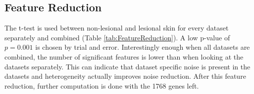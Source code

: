 \documentclass[10pt,a4paper]{article}
\begin{document}
	
	\subsection{Feature Reduction}
	\label{subsec:ResultsFeatureResuction}
	
	The t-test is used between non-lesional and lesional skin for every dataset separately and combined (Table \ref{tab:FeatureReduction}). A low p-value of $p=0.001$ is chosen by trial and error. Interestingly enough when all datasets are combined, the number of significant features is lower than when looking at the datasets separately. This can indicate that dataset specific noise is present in the datasets and heterogeneity actually improves noise reduction. After this feature reduction, further computation is done with the 1768 genes left.
	
\end{document}
